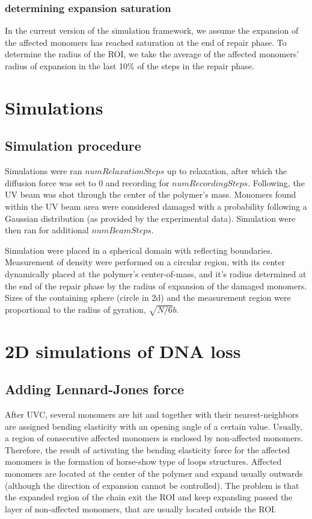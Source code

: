 \documentclass[12pt]{report}
\begin{document}
    \subsubsection{determining expansion saturation}
     In the current version of the simulation framework, we assume the expansion of the affected monomers has reached saturation at the end of repair phase. To determine the radius of the ROI, we take the average of the affected monomers' radius of expansion in the last 10\% of the steps in the repair phase. 

    		             		
	\section{Simulations}	
	
	\subsection{Simulation procedure}
	Simulations were ran $numRelaxationSteps$ up to relaxation, after which the diffusion force was set to $0$ and recording for $numRecordingSteps$. Following, the UV beam was shot through the center of the polymer's mass. Monomers found within the UV beam area were considered damaged with a probability following a Gaussian distribution (as provided by the experimental data). Simulation were then ran for additional $numBeamSteps$.
	
	Simulation were placed in a spherical domain with reflecting boundaries.
	Measurement of density were performed on a circular region, with its center dynamically placed at the polymer's center-of-mass, and it's radius determined at the end of the repair phase by the radius of expansion of the damaged monomers.
	Sizes of the containing sphere (circle in 2d) and the measurement region were proportional to the radius of gyration, $\sqrt{N/6}b$.
	

	  
	\section{2D simulations of DNA loss}
	 
	\subsection{Adding Lennard-Jones force}
      After UVC, several monomers are hit and together with their nearest-neighbors are assigned bending elasticity with an opening angle of a certain value. Usually, a region of consecutive affected monomers is enclosed by non-affected monomers. Therefore, the result of activating the bending elasticity force for the affected monomers is the formation of horse-show type of loops structures. 
      Affected monomers are located at the center of the polymer and expand usually outwards (although the direction of expansion cannot be controlled). The problem is that the expanded region of the chain exit the ROI and keep expanding passed the layer of non-affected monomers, that are usually located outside the ROI. 
      
\end{document}
